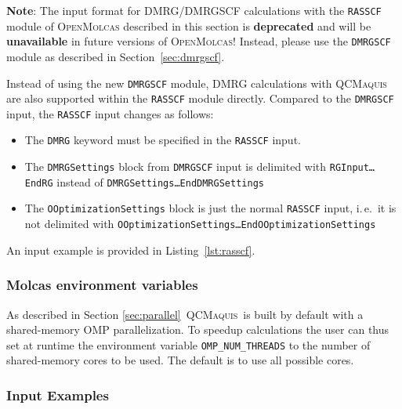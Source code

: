 \documentclass[bibliography=totoc,12pt,a4paper]{scrartcl}
\newcommand{\mol}{\textsc{OpenMolcas}}
\newcommand{\qcm}{\textsc{QCMaquis}}
\newcommand{\kwd}[1]{\texttt{#1}}
\begin{document}
\begin{framed}
  \noindent \textbf{Note}: The input format for DMRG/DMRGSCF calculations with the \kwd{RASSCF} module of \mol{} described in this section is \textbf{deprecated} and will be \textbf{unavailable} in future versions of \mol{}!
  \noindent Instead, please use the \kwd{DMRGSCF} module as described in Section~\ref{sec:dmrgscf}.
\end{framed}

Instead of using the new \kwd{DMRGSCF} module, DMRG calculations with \qcm{} are also supported within the \kwd{RASSCF} module directly.
Compared to the \kwd{DMRGSCF} input, the \kwd{RASSCF} input changes as follows:

\begin{itemize}
  \item The \kwd{DMRG} keyword must be specified in the \kwd{RASSCF} input.
  \item The \kwd{DMRGSettings} block from \kwd{DMRGSCF} input is delimited with \kwd{RGInput\ldots{}EndRG} instead of \kwd{DMRGSettings\ldots{}EndDMRGSettings}
  \item The \kwd{OOptimizationSettings} block is just the normal \kwd{RASSCF} input, i.\,e.\ it is not delimited with \kwd{OOptimizationSettings\ldots{}EndOOptimizationSettings}
\end{itemize}

An input example is provided in Listing~\ref{lst:rasscf}.

\subsubsection{Molcas environment variables}

\noindent As described in Section \ref{sec:parallel}\ \qcm\ is built by default with a shared-memory
OMP parallelization. To speedup calculations the user can thus set at runtime the environment variable \texttt{OMP\_NUM\_THREADS} to the number of shared-memory cores to be used. The default is to use all possible cores.

\subsubsection{Input Examples}
\end{document}
